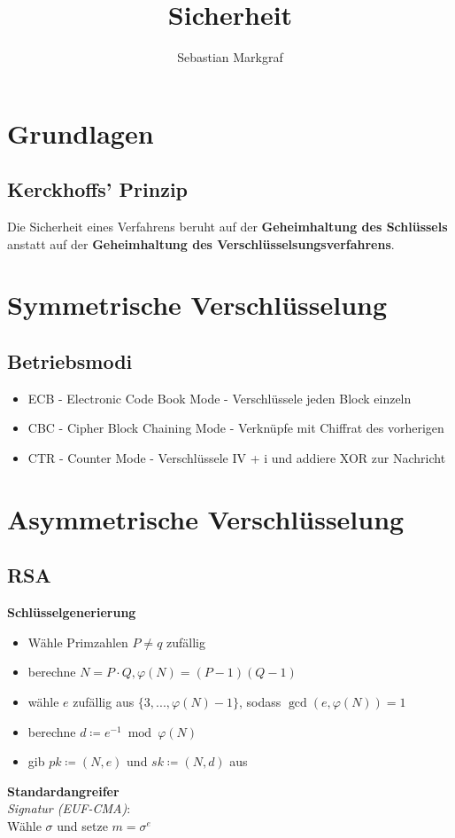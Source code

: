 \documentclass[10pt,a4paper]{article}
\author{Sebastian Markgraf}
\title{Sicherheit}
\begin{document}
	{\let\newpage\relax\maketitle}
	\tableofcontents
	\newpage
	\setcounter{page}{1}

        \section{Grundlagen}
        \subsection{Kerckhoffs' Prinzip}
        Die Sicherheit eines Verfahrens beruht auf der \textbf{Geheimhaltung des Schlüssels}
        anstatt auf der \textbf{Geheimhaltung des Verschlüsselsungsverfahrens}.
        
	\section{Symmetrische Verschlüsselung}
        \subsection{Betriebsmodi}
        \begin{itemize}
        \item ECB - Electronic Code Book Mode - Verschlüssele jeden Block einzeln
        \item CBC - Cipher Block Chaining Mode - Verknüpfe mit Chiffrat des vorherigen
        \item CTR - Counter Mode - Verschlüssele IV + i und addiere XOR zur Nachricht
        \end{itemize}

        \section{Asymmetrische Verschlüsselung}
        \subsection{RSA}
        \textbf{Schlüsselgenerierung}
        \begin{itemize}
          \item Wähle Primzahlen \(P \neq q\) zufällig
          \item berechne \(N = P \cdot Q, \varphi(N) = (P-1)(Q-1)\)
          \item wähle \(e\) zufällig aus \(\{3,...,\varphi(N)-1\}\), sodass \(\gcd(e, \varphi(N)) = 1\)
          \item berechne \(d \coloneqq e^{-1} \bmod \varphi(N)\)
          \item gib \(\mathit{pk} \coloneqq (N, e)\) und \(\mathit{sk} \coloneqq (N, d)\) aus
        \end{itemize}
        \textbf{Standardangreifer}\\
        \textit{Signatur (EUF-CMA)}:\\
        Wähle \(\sigma\) und setze \(m = \sigma^e\)
\end{document}
